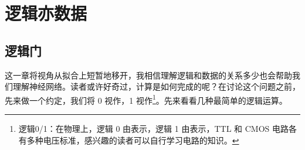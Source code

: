 \section{逻辑亦数据}
\subsection{逻辑门}

这一章将视角从拟合上短暂地移开，我相信理解逻辑和数据的关系多少也会帮助我们理解神经网络。读者或许好奇过，计算是如何完成的呢？在讨论这个问题之前，先来做一个约定，我们将 0 视作，1 视作\footnote{逻辑0/1：在物理上，逻辑 0 由表示，逻辑 1 由表示，TTL 和 CMOS 电路各有多种电压标准，感兴趣的读者可以自行学习电路的知识。}。先来看看几种最简单的逻辑运算。

